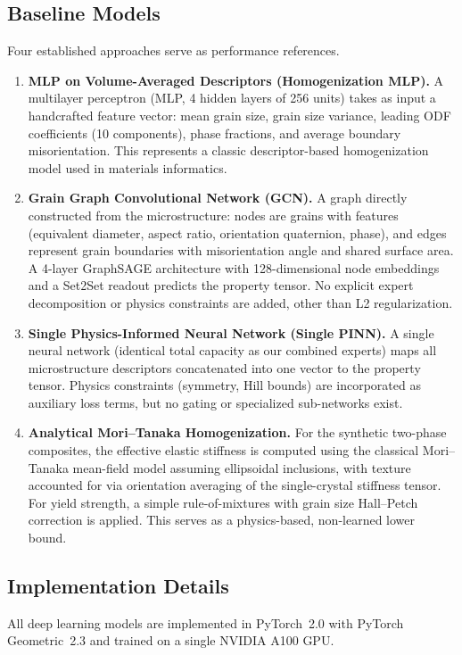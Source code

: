 \documentclass{article}
\begin{document}
\subsection{Baseline Models}
Four established approaches serve as performance references.
\begin{enumerate}
    \item \textbf{MLP on Volume-Averaged Descriptors (Homogenization MLP).} A multilayer perceptron (MLP, 4 hidden layers of 256 units) takes as input a handcrafted feature vector: mean grain size, grain size variance, leading ODF coefficients (10 components), phase fractions, and average boundary misorientation. This represents a classic descriptor-based homogenization model used in materials informatics.
    \item \textbf{Grain Graph Convolutional Network (GCN).} A graph directly constructed from the microstructure: nodes are grains with features (equivalent diameter, aspect ratio, orientation quaternion, phase), and edges represent grain boundaries with misorientation angle and shared surface area. A 4-layer GraphSAGE architecture with 128-dimensional node embeddings and a Set2Set readout predicts the property tensor. No explicit expert decomposition or physics constraints are added, other than L2 regularization.
    \item \textbf{Single Physics-Informed Neural Network (Single PINN).} A single neural network (identical total capacity as our combined experts) maps all microstructure descriptors concatenated into one vector to the property tensor. Physics constraints (symmetry, Hill bounds) are incorporated as auxiliary loss terms, but no gating or specialized sub-networks exist.
    \item \textbf{Analytical Mori–Tanaka Homogenization.} For the synthetic two-phase composites, the effective elastic stiffness is computed using the classical Mori–Tanaka mean-field model assuming ellipsoidal inclusions, with texture accounted for via orientation averaging of the single-crystal stiffness tensor. For yield strength, a simple rule-of-mixtures with grain size Hall–Petch correction is applied. This serves as a physics-based, non-learned lower bound.
\end{enumerate}

\subsection{Implementation Details}
All deep learning models are implemented in PyTorch~2.0 with PyTorch Geometric~2.3 and trained on a single NVIDIA A100 GPU.
\end{document}

